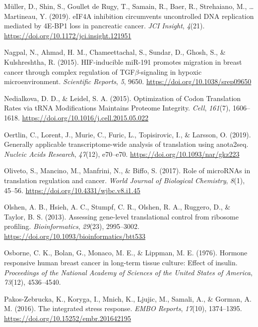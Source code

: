 \documentclass[12pt,openany]{book}
\begin{document}
\hypertarget{ref-Muller2019}{}
Müller, D., Shin, S., Goullet de Rugy, T., Samain, R., Baer, R.,
Strehaiano, M., \ldots{} Martineau, Y. (2019). eIF4A inhibition
circumvents uncontrolled DNA replication mediated by 4E-BP1 loss in
pancreatic cancer. \emph{JCI Insight}, \emph{4}(21).
\url{https://doi.org/10.1172/jci.insight.121951}

\hypertarget{ref-Nagpal2015}{}
Nagpal, N., Ahmad, H. M., Chameettachal, S., Sundar, D., Ghosh, S., \&
Kulshreshtha, R. (2015). HIF-inducible miR-191 promotes migration in
breast cancer through complex regulation of TGF\(\beta\)-signaling in
hypoxic microenvironment. \emph{Scientific Reports}, \emph{5}, 9650.
\url{https://doi.org/10.1038/srep09650}

\hypertarget{ref-Nedialkova2015}{}
Nedialkova, D. D., \& Leidel, S. A. (2015). Optimization of Codon
Translation Rates via tRNA Modifications Maintains Proteome Integrity.
\emph{Cell}, \emph{161}(7), 1606--1618.
\url{https://doi.org/10.1016/j.cell.2015.05.022}

\hypertarget{ref-Oertlin2019}{}
Oertlin, C., Lorent, J., Murie, C., Furic, L., Topisirovic, I., \&
Larsson, O. (2019). Generally applicable transcriptome-wide analysis of
translation using anota2seq. \emph{Nucleic Acids Research},
\emph{47}(12), e70--e70. \url{https://doi.org/10.1093/nar/gkz223}

\hypertarget{ref-Oliveto2017}{}
Oliveto, S., Mancino, M., Manfrini, N., \& Biffo, S. (2017). Role of
microRNAs in translation regulation and cancer. \emph{World Journal of
Biological Chemistry}, \emph{8}(1), 45--56.
\url{https://doi.org/10.4331/wjbc.v8.i1.45}

\hypertarget{ref-Olshen2013}{}
Olshen, A. B., Hsieh, A. C., Stumpf, C. R., Olshen, R. A., Ruggero, D.,
\& Taylor, B. S. (2013). Assessing gene-level translational control from
ribosome profiling. \emph{Bioinformatics}, \emph{29}(23), 2995--3002.
\url{https://doi.org/10.1093/bioinformatics/btt533}

\hypertarget{ref-Osborne1976}{}
Osborne, C. K., Bolan, G., Monaco, M. E., \& Lippman, M. E. (1976).
Hormone responsive human breast cancer in long-term tissue culture:
Effect of insulin. \emph{Proceedings of the National Academy of Sciences
of the United States of America}, \emph{73}(12), 4536--4540.

\hypertarget{ref-Pakos-Zebrucka2016}{}
Pakos-Zebrucka, K., Koryga, I., Mnich, K., Ljujic, M., Samali, A., \&
Gorman, A. M. (2016). The integrated stress response. \emph{EMBO
Reports}, \emph{17}(10), 1374--1395.
\url{https://doi.org/10.15252/embr.201642195}
\end{document}
